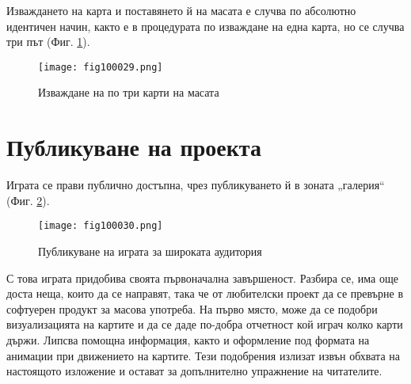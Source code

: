 Изваждането на карта и поставянето й на масата е случва по абсолютно идентичен начин, както е в процедурата по изваждане на една карта, но се случва три път (Фиг. \ref{fig100029}).

\begin{figure}[H]
  \centering
  \texttt{[image: fig100029.png]}
  \caption{Изваждане на по три карти на масата}
\label{fig100029}
\end{figure}

\section{Публикуване на проекта}

Играта се прави публично достъпна, чрез публикуването й в зоната „галерия“ (Фиг. \ref{fig100030}).

\begin{figure}[H]
  \centering
  \texttt{[image: fig100030.png]}
  \caption{Публикуване на играта за широката аудитория}
\label{fig100030}
\end{figure}

С това играта придобива своята първоначална завършеност. Разбира се, има още доста неща, които да се направят, така че от любителски проект да се превърне в софтуерен продукт за масова употреба. На първо място, може да се подобри визуализацията на картите и да се даде по-добра отчетност кой играч колко карти държи. Липсва помощна информация, както и оформление под формата на анимации при движението на картите. Тези подобрения излизат извън обхвата на настоящото изложение и остават за допълнително упражнение на читателите. 

